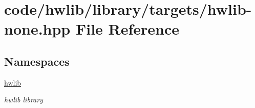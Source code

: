 \hypertarget{hwlib-none_8hpp}{}\section{code/hwlib/library/targets/hwlib-\/none.hpp File Reference}
\label{hwlib-none_8hpp}
\subsection*{Namespaces}
\begin{DoxyCompactItemize}
\item 
 \hyperlink{namespacehwlib}{hwlib}
\begin{DoxyCompactList}\small\item\em hwlib library \end{DoxyCompactList}\end{DoxyCompactItemize}
